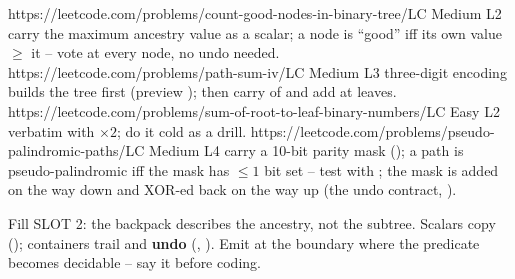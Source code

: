 \begin{practiceset}
    {https://leetcode.com/problems/count-good-nodes-in-binary-tree/}{LC Medium L2}
    {carry the maximum ancestry value as a scalar; a node is ``good'' iff its own
    value $\ge$ it -- vote at every node, no undo needed.}
    {https://leetcode.com/problems/path-sum-iv/}{LC Medium L3}
    {three-digit encoding builds the tree first (preview );
    then carry  of  and add at leaves.}
    {https://leetcode.com/problems/sum-of-root-to-leaf-binary-numbers/}{LC Easy L2}
    { verbatim with $\times 2$; do it cold as a drill.}
    {https://leetcode.com/problems/pseudo-palindromic-paths/}{LC Medium L4}
    {carry a 10-bit parity mask (); a path is pseudo-palindromic
    iff the mask has $\le 1$ bit set -- test with ; the
    mask is added on the way down and XOR-ed back on the way up (the undo
    contract, ).}
\end{practiceset}

\begin{recallbox}
Fill SLOT 2: the backpack describes the ancestry, not the subtree. Scalars copy
(); containers trail and \textbf{undo}
(, ). Emit at the boundary
where the predicate becomes decidable -- say it before coding.
\end{recallbox}
